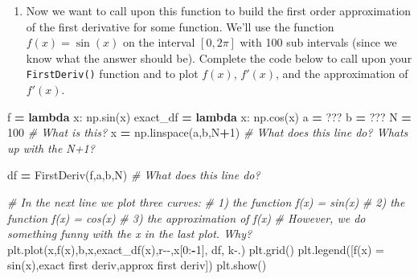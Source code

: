 \documentclass[
]{book}
\newenvironment{Shaded}{\begin{snugshade}}{\end{snugshade}}
\newcommand{\CommentTok}[1]{\textcolor[rgb]{0.56,0.35,0.01}{\textit{#1}}}
\newcommand{\DecValTok}[1]{\textcolor[rgb]{0.00,0.00,0.81}{#1}}
\newcommand{\KeywordTok}[1]{\textcolor[rgb]{0.13,0.29,0.53}{\textbf{#1}}}
\newcommand{\NormalTok}[1]{#1}
\newcommand{\OperatorTok}[1]{\textcolor[rgb]{0.81,0.36,0.00}{\textbf{#1}}}
\newcommand{\StringTok}[1]{\textcolor[rgb]{0.31,0.60,0.02}{#1}}
\providecommand{\tightlist}{%
  \setlength{\itemsep}{0pt}\setlength{\parskip}{0pt}}
\theoremstyle{definition}
\theoremstyle{definition}
\theoremstyle{definition}
\theoremstyle{remark}
\begin{document}
\begin{enumerate}
\def\labelenumi{\alph{enumi}.}
\setcounter{enumi}{2}
\tightlist
\item
  Now we want to call upon this function to build the first order approximation of the first derivative for some function. We'll use the function \(f(x) = \sin(x)\) on the interval \([0,2\pi]\) with 100 sub intervals (since we know what the answer should be). Complete the code below to call upon your \texttt{FirstDeriv()} function and to plot \(f(x)\), \(f'(x)\), and the approximation of \(f'(x)\).
\end{enumerate}

\begin{Shaded}
\begin{Highlighting}[]
\NormalTok{f }\OperatorTok{=} \KeywordTok{lambda}\NormalTok{ x: np.sin(x)}
\NormalTok{exact\_df }\OperatorTok{=} \KeywordTok{lambda}\NormalTok{ x: np.cos(x)}
\NormalTok{a }\OperatorTok{=}\NormalTok{ ???}
\NormalTok{b }\OperatorTok{=}\NormalTok{ ???}
\NormalTok{N }\OperatorTok{=} \DecValTok{100} \CommentTok{\# What is this?}
\NormalTok{x }\OperatorTok{=}\NormalTok{ np.linspace(a,b,N}\OperatorTok{+}\DecValTok{1}\NormalTok{) }\CommentTok{\# What does this line do?  What\textquotesingle{}s up with the N+1?}

\NormalTok{df }\OperatorTok{=}\NormalTok{ FirstDeriv(f,a,b,N) }\CommentTok{\# What does this line do?}

\CommentTok{\# In the next line we plot three curves: }
\CommentTok{\# 1) the function f(x) = sin(x)}
\CommentTok{\# 2) the function f\textquotesingle{}(x) = cos(x)}
\CommentTok{\# 3) the approximation of f\textquotesingle{}(x)}
\CommentTok{\# However, we do something funny with the x in the last plot.  Why?}
\NormalTok{plt.plot(x,f(x),}\StringTok{\textquotesingle{}b\textquotesingle{}}\NormalTok{,x,exact\_df(x),}\StringTok{\textquotesingle{}r{-}{-}\textquotesingle{}}\NormalTok{,x[}\DecValTok{0}\NormalTok{:}\OperatorTok{{-}}\DecValTok{1}\NormalTok{], df, }\StringTok{\textquotesingle{}k{-}.\textquotesingle{}}\NormalTok{)}
\NormalTok{plt.grid()}
\NormalTok{plt.legend([}\StringTok{\textquotesingle{}f(x) = sin(x)\textquotesingle{}}\NormalTok{,}\StringTok{\textquotesingle{}exact first deriv\textquotesingle{}}\NormalTok{,}\StringTok{\textquotesingle{}approx first deriv\textquotesingle{}}\NormalTok{])}
\NormalTok{plt.show()}
\end{Highlighting}
\end{Shaded}
\end{document}
